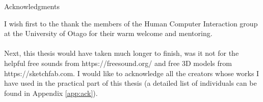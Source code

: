 \thispagestyle{empty}

\vspace*{20mm}

\begin{center}
{ Acknowledgments}
\end{center}

\vspace{10mm}

I wish first to the thank the members of the Human Computer Interaction group at the University of Otago for their warm welcome and mentoring. 

\paragraph[]{} Next, this thesis would have taken much longer to finish, was it not for the helpful free sounds from https://freesound.org/ and free 3D models from https://sketchfab.com. I would like to acknowledge all the creators whose works I have used in the practical part of this thesis (a detailed list of individuals can be found in Appendix \ref{app:ack}).

\cleardoublepage{}
